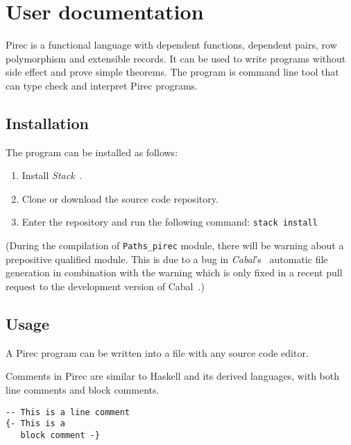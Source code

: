 \chapter{User documentation}\label{ch:userdocs}

Pirec is a functional language with dependent functions, dependent pairs, row
polymorphism and extensible records. It can be used to write programs without
side effect and prove simple theorems. The program is command line tool that can
type check and interpret Pirec programs.

\section{Installation}\label{sec:install}

The program can be installed as follows:
\begin{enumerate}
  \item Install \emph{Stack}~\cite{stack}.
  \item Clone or download the source code repository.
  \item Enter the repository and run the following command:
        \texttt{stack install}
\end{enumerate}

(During the compilation of \texttt{Paths\_pirec} module, there will be warning
about a prepositive qualified module. This is due to a bug in
\emph{Cabal}'s~\cite{cabal} automatic file generation in combination with the
warning which is only fixed in a recent pull request to the development version
of Cabal~\cite{cabal-prepos}.)

\section{Usage}\label{sec:usage}

A Pirec program can be written into a file with any source code editor.

Comments in Pirec are similar to Haskell and its derived languages, with
both line comments and block comments.
\begin{verbatim}
-- This is a line comment
{- This is a
   block comment -}
\end{verbatim}

